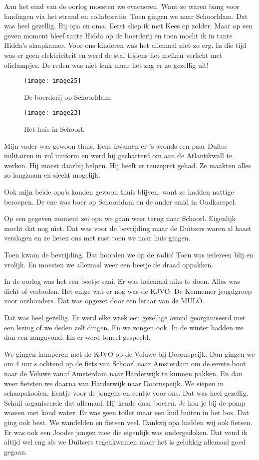 Aan het eind van de oorlog moesten we evacueren. Want ze waren bang voor landingen via het strand en collaboratie. Toen gingen we naar Schoorldam. Dat was heel gezellig. Bij opa en oma. Eerst sliep ik met Kees op zolder. Maar op een geven moment bleef tante Hidda op de boerderij en toen mocht ik in tante Hidda’s slaapkamer. Voor ons kinderen was het allemaal niet zo erg. In die tijd was er geen elektriciteit en werd de stal tijdens het melken verlicht met olielampjes. De reden was niet leuk maar het zag er zo gezellig uit!

\begin{figure}[h]
    \texttt{[image: image25]}
    \caption{De boerderij op Schoorldam.}
\end{figure}

\begin{figure}[h]
    \texttt{[image: image23]}
    \caption{Het huis in Schoorl.}
\end{figure}

Mijn vader was gewoon thuis. Eens kwamen er ’s avonds een paar Duitse militairen in vol uniform en werd hij gecharterd om aan de Atlantikwall te werken. Hij moest daarbij helpen. Hij heeft er reuzepret gehad. Ze maakten alles zo langzaam en slecht mogelijk. 

Ook mijn beide opa’s konden gewoon thuis blijven, want ze hadden nuttige beroepen. De ene was boer op Schoorldam en de ander smid in Oudkarspel. 

Op een gegeven moment zei opa we gaan weer terug naar Schoorl. Eigenlijk mocht dat nog niet. Dat was voor de bevrijding maar de Duitsers waren al haast verslagen en ze lieten ons met rust toen we naar huis gingen.

Toen kwam de bevrijding. Dat hoorden we op de radio! Toen was iedereen blij en vrolijk. En moesten we allemaal weer een beetje de draad oppakken. 

In de oorlog was het een beetje saai. Er was helemaal niks te doen. Alles was dicht of verboden. Het enige wat er nog was de KJVO. De Kennemer jeugdgroep voor onthouders. Dat was opgezet door een leraar van de MULO. 

Dat was heel gezellig. Er werd elke week een gezellige avond georganiseerd met een lezing of we deden zelf dingen. En we zongen ook. In de winter hadden we dan een zangavond. En er werd toneel gespeeld.

We gingen kamperen met de KJVO op de Veluwe bij Doornspeijk. Dan gingen we om 4 uur s ochtend op de fiets van Schoorl naar Amsterdam om de eerste boot naar de Veluwe vanaf Amsterdam naar Harderwijk te kunnen pakken. En dan weer fietsten we daarna van Harderwijk naar Doornspeijk. We siepen in schaapskooien. Eentje voor de jongens en eentje voor ons. Dat was heel gezellig. Schuil organiseerde dat allemaal. Hij kende daar boeren. Je kon je bij de pomp wassen met koud water. Er was geen toilet maar een kuil buiten in het bos. Dat ging ook best. We wandelden en fietsen veel. Dankzij opa hadden wij ook fietsen. Er was ook een Joodse jongen mee die eigenlijk was ondergedoken. Dat vond ik altijd wel eng als we Duitsers tegenkwamen maar het is gelukkig allemaal goed gegaan. 